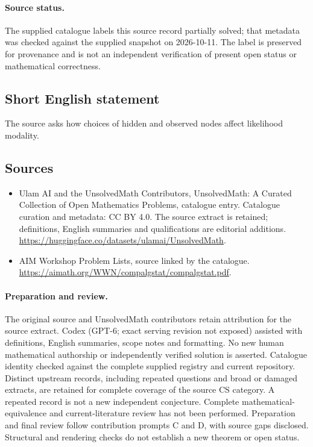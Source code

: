 \documentclass[11pt]{article}
\begin{document}
\paragraph{Source status.}
The supplied catalogue labels this source record partially solved; that metadata was checked against the supplied snapshot on 2026-10-11. The label is preserved for provenance and is not an independent verification of present open status or mathematical correctness.
\subsection{Short English statement}
The source asks how choices of hidden and observed nodes affect likelihood modality.
\subsection{Sources}
\begin{itemize}
\item[\hypertarget{source:statement:1}{S1}] Ulam AI and the UnsolvedMath Contributors, UnsolvedMath: A Curated Collection of Open Mathematics Problems, catalogue entry. Catalogue curation and metadata: CC BY 4.0. The source extract is retained; definitions, English summaries and qualifications are editorial additions.
\url{https://huggingface.co/datasets/ulamai/UnsolvedMath}.
\item[\hypertarget{source:statement:2}{S2}] AIM Workshop Problem Lists, source linked by the catalogue.
\url{https://aimath.org/WWN/compalgstat/compalgstat.pdf}.
\end{itemize}
\paragraph{Preparation and review.}
The original source and UnsolvedMath contributors retain attribution for the source extract. Codex (GPT-6; exact serving revision not exposed) assisted with definitions, English summaries, scope notes and formatting. No new human mathematical authorship or independently verified solution is asserted. Catalogue identity checked against the complete supplied registry and current repository. Distinct upstream records, including repeated questions and broad or damaged extracts, are retained for complete coverage of the source CS category. A repeated record is not a new independent conjecture. Complete mathematical-equivalence and current-literature review has not been performed. Preparation and final review follow contribution prompts C and D, with source gaps disclosed. Structural and rendering checks do not establish a new theorem or open status.
\label{end:statement}
\end{document}
